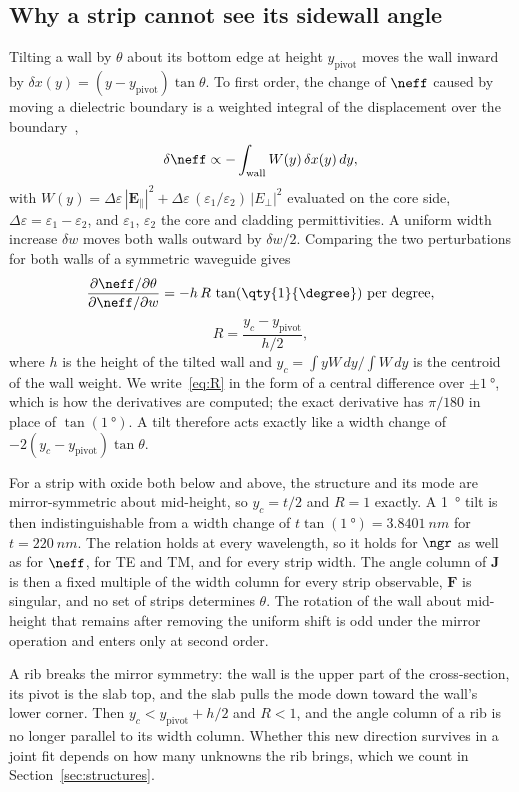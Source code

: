 \subsection{Why a strip cannot see its sidewall angle}

Tilting a wall by $\theta$ about its bottom edge at height $y_\mathrm{pivot}$ moves the wall inward by
$\delta x(y)=(y-y_\mathrm{pivot})\tan\theta$. To first order, the change of $\neff$ caused by moving a dielectric
boundary is a weighted integral of the displacement over the boundary~\cite{johnson2002},
\begin{equation}
\delta\neff\propto-\int_{\mathrm{wall}} W(y)\,\delta x(y)\,dy,
\label{eq:boundary}
\end{equation}
with $W(y)=\Delta\varepsilon\,|\mathbf{E}_\parallel|^2+\Delta\varepsilon\,(\varepsilon_1/\varepsilon_2)\,|E_\perp|^2$
evaluated on the core side, $\Delta\varepsilon=\varepsilon_1-\varepsilon_2$, and $\varepsilon_1$, $\varepsilon_2$
the core and cladding permittivities. A uniform width increase $\delta w$ moves both walls outward by $\delta w/2$.
Comparing the two perturbations for both walls of a symmetric waveguide gives
\begin{equation}
\frac{\partial\neff/\partial\theta}{\partial\neff/\partial w}=-h\,R\,\tan(\qty{1}{\degree})\ \text{per degree},
\label{eq:R}
\end{equation}
\begin{equation}
R=\frac{y_c-y_\mathrm{pivot}}{h/2},
\label{eq:Rdef}
\end{equation}
where $h$ is the height of the tilted wall and $y_c=\int yW\,dy/\int W\,dy$ is the centroid of the wall weight. We
write~\eqref{eq:R} in the form of a central difference over $\pm\qty{1}{\degree}$, which is how the derivatives are
computed; the exact derivative has $\pi/180$ in place of $\tan(\qty{1}{\degree})$. A tilt
therefore acts exactly like a width change of $-2(y_c-y_\mathrm{pivot})\tan\theta$.

For a strip with oxide both below and above, the structure and its mode are mirror-symmetric about mid-height, so
$y_c=t/2$ and $R=1$ exactly. A \qty{1}{\degree} tilt is then indistinguishable from a width change of
$t\tan(\qty{1}{\degree})=\qty{3.8401}{nm}$ for $t=\qty{220}{nm}$. The relation holds at every wavelength, so it
holds for $\ngr$ as well as for $\neff$, for TE and TM, and for every strip width. The angle column of $\mathbf{J}$ is
then a fixed multiple of the width column for every strip observable, $\mathbf{F}$ is singular, and no set of strips
determines $\theta$. The rotation of the wall about mid-height that remains after removing the uniform shift is odd
under the mirror operation and enters only at second order.

A rib breaks the mirror symmetry: the wall is the upper part of the cross-section, its pivot is the slab top, and the
slab pulls the mode down toward the wall's lower corner. Then $y_c<y_\mathrm{pivot}+h/2$ and $R<1$, and the angle
column of a rib is no longer parallel to its width column. Whether this new direction survives in a joint fit depends
on how many unknowns the rib brings, which we count in Section~\ref{sec:structures}.
